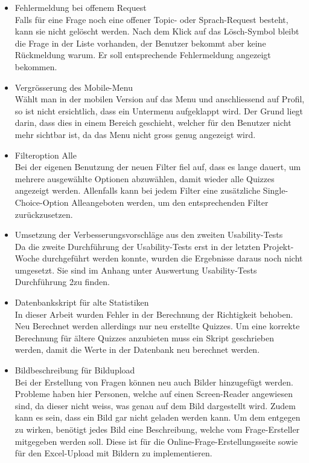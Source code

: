 \begin{itemize}
	\item Fehlermeldung bei offenem Request\\
	Falls für eine Frage noch eine offener Topic- oder Sprach-Request besteht, kann sie nicht gelöscht werden. Nach dem Klick auf das Lösch-Symbol bleibt die Frage in der Liste vorhanden, der Benutzer bekommt aber keine Rückmeldung warum. Er soll entsprechende Fehlermeldung angezeigt bekommen.
	
	\item Vergrösserung des Mobile-Menu\\
	Wählt man in der mobilen Version auf das Menu und anschliessend auf Profil, so ist nicht ersichtlich, dass ein Untermenu aufgeklappt wird. Der Grund liegt darin, dass dies in einem Bereich geschieht, welcher für den Benutzer nicht mehr sichtbar ist, da das Menu nicht gross genug angezeigt wird.
	
	\item Filteroption \glqq Alle\grqq \\
	Bei der eigenen Benutzung der neuen Filter fiel auf, dass es lange dauert, um mehrere ausgewählte Optionen abzuwählen, damit wieder alle Quizzes angezeigt werden. Allenfalls kann bei jedem Filter eine zusätzliche Single-Choice-Option \glqq Alle\grqq angeboten werden, um den entsprechenden Filter zurückzusetzen.
	
	\item Umsetzung der Verbesserungsvorschläge aus den zweiten Usability-Tests\\
	Da die zweite Durchführung der Usability-Tests erst in der letzten Projekt-Woche durchgeführt werden konnte, wurden die Ergebnisse daraus noch nicht umgesetzt. Sie sind im Anhang unter \glqq Auswertung Usability-Tests Durchführung 2\grqq zu finden.
	
	\item Datenbankskript für alte Statistiken\\
	In dieser Arbeit wurden Fehler in der Berechnung der Richtigkeit behoben. Neu Berechnet werden allerdings nur neu erstellte Quizzes. Um eine korrekte Berechnung für ältere Quizzes anzubieten muss ein Skript geschrieben werden, damit die Werte in der Datenbank neu berechnet werden.
	
	\item Bildbeschreibung für Bildupload \\
	Bei der Erstellung von Fragen können neu auch Bilder hinzugefügt werden. Probleme haben hier Personen, welche auf einen Screen-Reader angewiesen sind, da dieser nicht weiss, was genau auf dem Bild dargestellt wird. Zudem kann es sein, dass ein Bild gar nicht geladen werden kann. Um dem entgegen zu wirken, benötigt jedes Bild eine Beschreibung, welche vom Frage-Ersteller mitgegeben werden soll. Diese ist für die Online-Frage-Erstellungsseite sowie für den Excel-Upload mit Bildern zu implementieren.
\end{itemize}





